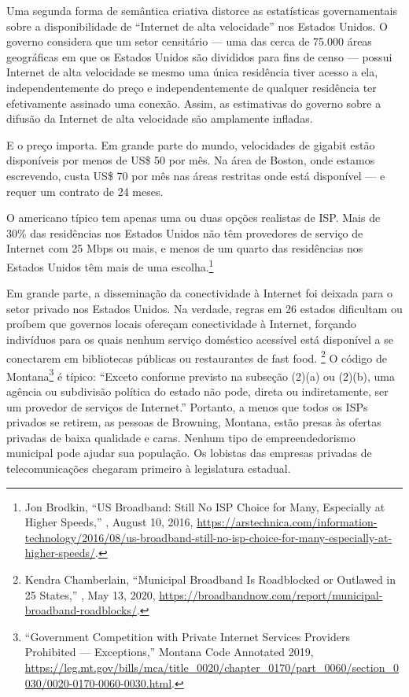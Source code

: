 Uma segunda forma de semântica criativa distorce as estatísticas governamentais sobre a
disponibilidade de ``Internet de alta velocidade'' nos Estados Unidos. O governo considera que
um setor censitário --- uma das cerca de 75.000 áreas geográficas em que os Estados Unidos
são divididos para fins de censo --- possui Internet de alta velocidade se mesmo uma única
residência tiver acesso a ela, independentemente do preço e independentemente de qualquer
residência ter efetivamente assinado uma conexão. Assim, as estimativas do governo sobre a
difusão da Internet de alta velocidade são amplamente infladas.

E o preço importa. Em grande parte do mundo, velocidades de gigabit estão disponíveis por
menos de US\$ 50 por mês. Na área de Boston, onde estamos escrevendo, custa US\$ 70 por mês
nas áreas restritas onde está disponível --- e requer um contrato de 24 meses.

O americano típico tem apenas uma ou duas opções realistas de ISP. Mais de 30\% das
residências nos Estados Unidos não têm provedores de serviço de Internet com 25 Mbps ou mais,
e menos de um quarto das residências nos Estados Unidos têm mais de uma escolha.\footnote{Jon
Brodkin, ``US Broadband: Still No ISP Choice for Many, Especially at Higher Speeds,''
, August 10, 2016,
\url{https://arstechnica.com/information-technology/2016/08/us-broadband-still-no-isp-choice-for-many-especially-at-higher-speeds/}.}

Em grande parte, a disseminação da conectividade à Internet foi deixada para o setor privado
nos Estados Unidos. Na verdade, regras em 26 estados dificultam ou proíbem que governos locais
ofereçam conectividade à Internet, forçando indivíduos para os quais nenhum serviço doméstico
acessível está disponível a se conectarem em bibliotecas públicas ou restaurantes de fast food.
\footnote{Kendra Chamberlain, ``Municipal Broadband Is Roadblocked or Outlawed in 25 States,''
, May 13, 2020,
\url{https://broadbandnow.com/report/municipal-broadband-roadblocks/}.} O código de
Montana\footnote{``Government Competition with Private Internet Services Providers Prohibited
--- Exceptions,'' Montana Code Annotated 2019,
\url{https://leg.mt.gov/bills/mca/title_0020/chapter_0170/part_0060/section_0030/0020-0170-0060-0030.html}.}
é típico: ``Exceto conforme previsto na subseção (2)(a) ou (2)(b), uma agência ou subdivisão
política do estado não pode, direta ou indiretamente, ser um provedor de serviços de Internet.''
Portanto, a menos que todos os ISPs privados se retirem, as pessoas de Browning, Montana, estão
presas às ofertas privadas de baixa qualidade e caras. Nenhum tipo de empreendedorismo municipal
pode ajudar sua população. Os lobistas das empresas privadas de telecomunicações chegaram
primeiro à legislatura estadual.

